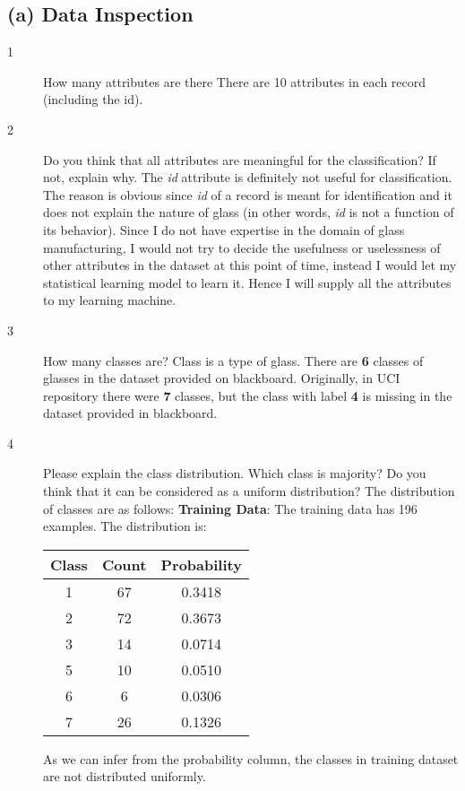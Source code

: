 \documentclass[letterpaper,doc,notimes]{apa6}
\begin{document}
\subsection{(a) Data Inspection}
\begin{description}
	\item[1] How many attributes are there
	\newline There are 10 attributes in each record (including the id).
	
	\item[2] Do you think that all attributes are meaningful for the classification? If not, explain why.
	The \textit{id} attribute is definitely not useful for classification. The reason is obvious since \textit{id} of a record is meant for identification and it does not explain the nature of glass (in other words, \textit{id} is not a function of its behavior).
	 Since I do not have expertise in the domain of glass manufacturing, I would not try to decide the usefulness or uselessness of other attributes in the dataset at this point of time, instead I would let my statistical learning model to learn it. Hence I will supply all the attributes to my learning machine.
	 
	 \item[3] How many classes are? Class is a type of glass.
		 There are \textbf{6} classes of glasses in the dataset provided on blackboard. Originally, in UCI repository there were \textbf{7} classes, but the class with label \textbf{4} is missing in the dataset provided in blackboard.
	
	\item[4] Please explain the class distribution. Which class is majority? Do you think that it can be considered as a uniform distribution?
	The distribution of classes are as follows:
	\textbf{Training Data}:\newline
	The training data has 196 examples. The distribution is: \newline
	\begin{tabular}{| c | c | c| }
		\hline
		Class & Count & Probability \\
		\hline \hline
		1     &  67   &  0.3418 \\ \hline
		2     &  72   &  0.3673 \\ \hline
		3     &  14   &  0.0714 \\ \hline
		5     &  10   &  0.0510 \\ \hline
		6     &   6   &  0.0306 \\ \hline
		7     &  26   &  0.1326 \\ \hline
	\end{tabular} \newline
	As we can infer from the probability column, the classes in training dataset are not distributed uniformly.


\end{description}
\end{document}
